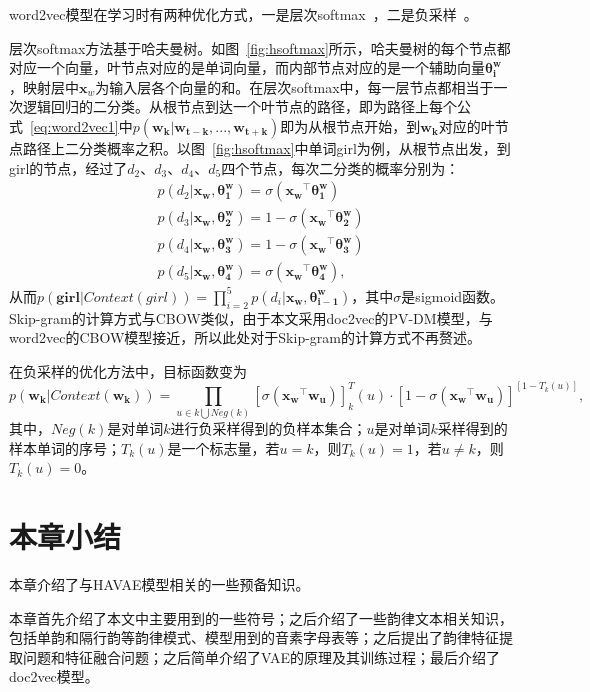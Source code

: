 word2vec模型在学习时有两种优化方式，一是层次softmax~\cite{morin2005hierarchical}，二是负采样~\cite{mikolov2013distributed}。\par
层次softmax方法基于哈夫曼树。如图~\ref{fig:hsoftmax}所示，哈夫曼树的每个节点都对应一个向量，叶节点对应的是单词向量，而内部节点对应的是一个辅助向量$\bm {\theta^w_i}$，映射层中$\bm x_w$为输入层各个向量的和。在层次softmax中，每一层节点都相当于一次逻辑回归的二分类。从根节点到达一个叶节点的路径，即为路径上每个公式~\ref{eq:word2vec1}中$p(\bm {w_k}|\bm {w_{t-k}}, ..., \bm{w_{t+k}})$即为从根节点开始，到$\bm {w_k}$对应的叶节点路径上二分类概率之积。以图~\ref{fig:hsoftmax}中单词girl为例，从根节点出发，到girl的节点，经过了$d_2$、$d_3$、$d_4$、$d_5$四个节点，每次二分类的概率分别为：
\begin{equation}
  \label{eq:hsoftmax}
  \begin{gathered}
  p(d_2|\bm {x_w}, \bm {\theta_1^w}) = \sigma(\bm {x_w}^\top \bm{\theta_1^w})\\
  p(d_3|\bm {x_w}, \bm {\theta_2^w}) = 1-\sigma(\bm {x_w}^\top \bm{\theta_2^w})\\
  p(d_4|\bm {x_w}, \bm {\theta_3^w}) = 1-\sigma(\bm {x_w}^\top \bm{\theta_3^w})\\
  p(d_5|\bm {x_w}, \bm {\theta_4^w}) = \sigma(\bm {x_w}^\top \bm{\theta_4^w}),
  \end{gathered}
\end{equation}
从而$p(\bm {girl}|Context(girl)) = \prod_{i=2}^5 p(d_i|\bm {x_w}, \bm {\theta_{i-1}^w})$，其中$\sigma$是sigmoid函数。Skip-gram的计算方式与CBOW类似，由于本文采用doc2vec的PV-DM模型，与word2vec的CBOW模型接近，所以此处对于Skip-gram的计算方式不再赘述。\par

在负采样的优化方法中，目标函数变为
\begin{equation}
\label{eq:neg}
p(\bm {w_k}|Context(\bm {w_k})) = \prod_{u\in {k}\bigcup Neg(k)}{[\sigma(\bm{x_w}^\top \bm{w_u})]^T_k(u)\cdot{[1-\sigma(\bm{x_w}^\top \bm{w_u})]^{[1-T_k(u)]}}},
\end{equation}
其中，$Neg(k)$是对单词$k$进行负采样得到的负样本集合；$u$是对单词$k$采样得到的样本单词的序号；$T_k(u)$是一个标志量，若$u=k$，则$T_k(u)=1$，若$u\ne k$，则$T_k(u)=0$。

\section{本章小结}
本章介绍了与HAVAE模型相关的一些预备知识。\par
本章首先介绍了本文中主要用到的一些符号；之后介绍了一些韵律文本相关知识，包括单韵和隔行韵等韵律模式、模型用到的音素字母表等；之后提出了韵律特征提取问题和特征融合问题；之后简单介绍了VAE的原理及其训练过程；最后介绍了doc2vec模型。\par

